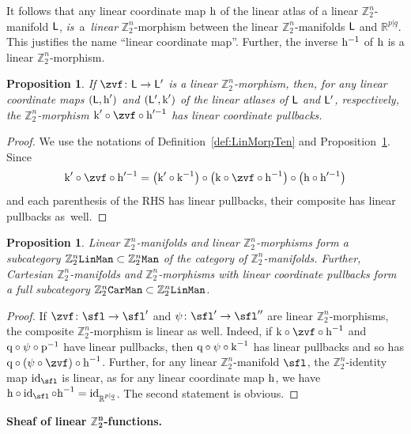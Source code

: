 \documentclass[10pt,a4paper]{amsart}
\newcommand{\rmh}{\textnormal{h}}
\newcommand{\rmk}{\textnormal{k}}
\newcommand{\rmp}{\textnormal{p}}
\newcommand{\rmq}{\textnormal{q}}
\newcommand{\op}[1]{\operatorname{#1}}
\newcommand{\catname}[1]{\textnormal{\texttt{#1}}}
\newcommand{\R}{{\mathbb R}}
\newcommand{\Z}{{\mathbb Z}}
\def\ul{\underline}
\def\ul{\underline}
\newcommand{\0}{\otimes}
\newcommand{\id}{\op{id}}
\newcommand{\z}{\Z_2^n}
\numberwithin{equation}{section}
\newtheorem{Proposition}[Theorem]{Proposition}
 { \theoremstyle{definition}
\newtheorem{Definition}[Theorem]{Definition}
\newtheorem{Example}[Theorem]{Example}
\newtheorem{Remark}[Theorem]{Remark} }
\begin{document}
It follows that any linear coordinate map $\rm h$ of the linear atlas of a linear $\z$-manifold $\sf L$, {\it is}~a~{\it linear} $\z$-morphism between the linear $\z$-manifolds $\sf L$ and $\R^{p|\ul q}$. This justifies the name ``linear coordinate map''. Further, the inverse ${\rm h}^{-1}$ of $\rm h$ is a linear $\z$-morphism.

\begin{Proposition}\label{prop:IndCoordMap}
If $\zvf\colon \sf L\to \sf L'$ is a linear $\z$-morphism, then, for any linear coordinate maps $(\sf L,\rmh')$ and $(\sf L',\rmk')$ of the linear atlases of $\sf L$ and $\sf L'$, respectively, the $\z$-morphism $\rmk'\circ\zvf\circ\rmh'^{-1}$ has linear coordinate pullbacks.
\end{Proposition}
\begin{proof}
We use the notations of Definition~\ref{def:LinMorpTen} and Proposition~\ref{prop:IndCoordMap}. Since
\[
\rmk'\circ\zvf\circ\rmh'^{-1}=\big(\rmk'\circ\rmk^{-1}\big)\circ \big(\rmk\circ \zvf\circ \rmh^{-1}\big)\circ\big(\rmh\circ\rmh'^{-1}\big)
\]
and each parenthesis of the {\small RHS} has linear pullbacks, their composite has linear pullbacks as~well.
\end{proof}

{\sloppy\begin{Proposition} Linear $\Z_2^n$-manifolds and linear $\z$-morphisms form a subcategory $\Z_2^n\catname{LinMan}\subset\z\tt Man$ of the category of $\z$-manifolds. Further, Cartesian $\z$-manifolds and $\z$-morphisms with linear coordinate pullbacks form a full subcategory $\z{\tt CarMan}\subset\z{\tt LinMan}$.
\end{Proposition}

}

\begin{proof}
If $\zvf\colon \sfl\to \sfl'$ and $\psi\colon \sfl'\to \sfl''$ are linear $\z$-morphisms, the composite $\z$-morphism is linear as well. Indeed, if $\rmk\circ\zvf\circ\rmh^{-1}$ and $\rmq\circ\psi\circ\rmp^{-1}$ have linear pullbacks, then $\rmq\circ\psi\circ\rmk^{-1}$ has linear pullbacks and so has $\rmq\circ(\psi\circ \zvf)\circ\rmh^{-1}$. Further, for any linear $\z$-manifold $\sfl$, the $\z$-identity map $\id_\sfl$ is linear, as for any linear coordinate map $\rmh$, we have $\rmh\circ\id_\sfl\circ\rmh^{-1}=\id_{\R^{p|\ul q}}$. The second statement is obvious.\end{proof}

\medskip\noindent
{\bf Sheaf of linear $\boldsymbol{\z}$-functions.}
\end{document}
